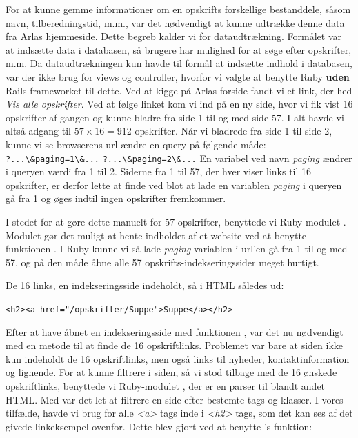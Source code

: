 For at kunne gemme informationer om en opskrifts forskellige bestanddele, såsom navn, tilberedningstid, m.m., var det nødvendigt at kunne udtrække denne data fra Arlas hjemmeside. Dette begreb kalder vi for dataudtrækning. Formålet var at indsætte data i databasen, så brugere har mulighed for at søge efter opskrifter, m.m. Da dataudtrækningen kun havde til formål at indsætte indhold i databasen, var der ikke brug for views og controller, hvorfor vi valgte at benytte Ruby \textbf{uden} Rails frameworket til dette.
Ved at kigge på Arlas forside fandt vi et link, der hed \textit{Vis alle opskrifter}. Ved at følge linket kom vi ind på en ny side, hvor vi fik vist 16 opskrifter af gangen og kunne bladre fra side 1 til og med side 57. I alt havde vi altså adgang til $57 \times 16 = 912$ opskrifter. Når vi bladrede fra side 1 til side 2, kunne vi se browserens url ændre en query på følgende måde:
\lstinline{?...\&paging=1\&...} 
\lstinline{?...\&paging=2\&...} 
En variabel ved navn \textit{paging} ændrer i queryen værdi fra 1 til 2. Siderne fra 1 til 57, der hver viser links til 16 opskrifter, er derfor lette at finde ved blot at lade en variablen \textit{paging} i queryen gå fra 1 og øges indtil ingen opskrifter fremkommer.

I stedet for at gøre dette manuelt for 57 opskrifter, benyttede vi Ruby-modulet . Modulet gør det muligt at hente indholdet af et website ved at benytte funktionen . I Ruby kunne vi så lade \textit{paging}-variablen i url'en gå fra 1 til og med 57, og på den måde åbne alle 57 opskrifts-indekseringssider meget hurtigt.

De 16 links, en indekseringsside indeholdt, så i HTML således ud:

\lstinline{<h2><a href="/opskrifter/Suppe">Suppe</a></h2>}

Efter at have åbnet en indekseringsside med funktionen , var det nu nødvendigt med en metode til at finde de 16 opskriftlinks. Problemet var bare at siden ikke kun indeholdt de 16 opskriftlinks, men også links til nyheder, kontaktinformation og lignende. For at kunne filtrere i siden, så vi stod tilbage med de 16 ønskede opskriftlinks, benyttede vi Ruby-modulet \cite{rubygemnokogiri}, der er en parser til blandt andet HTML. Med  var det let at filtrere en side efter bestemte tags og klasser. I vores tilfælde, havde vi brug for alle \textit{<a>} tags inde i \textit{<h2>} tags, som det kan ses af det givede linkeksempel ovenfor. Dette blev gjort ved at benytte 's funktion:

